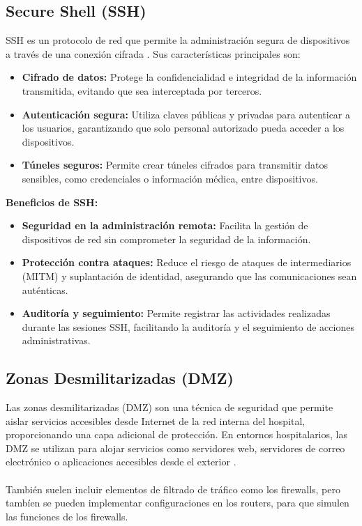 \subsection{Secure Shell (SSH)}
\label{subsec:ssh}
SSH es un protocolo de red que permite la administración segura de dispositivos a través de una conexión cifrada \cite{cisco-hospital-design}. Sus características principales son:
\begin{itemize}
    \item \textbf{Cifrado de datos:} Protege la confidencialidad e integridad de la información transmitida, evitando que sea interceptada por terceros.
    \item \textbf{Autenticación segura:} Utiliza claves públicas y privadas para autenticar a los usuarios, garantizando que solo personal autorizado pueda acceder a los dispositivos.
    \item \textbf{Túneles seguros:} Permite crear túneles cifrados para transmitir datos sensibles, como credenciales o información médica, entre dispositivos.
\end{itemize}
\textbf{Beneficios de SSH:}
\begin{itemize}
    \item \textbf{Seguridad en la administración remota:} Facilita la gestión de dispositivos de red sin comprometer la seguridad de la información.
    \item \textbf{Protección contra ataques:} Reduce el riesgo de ataques de intermediarios (\ac{MITM}) y suplantación de identidad, asegurando que las comunicaciones sean auténticas.
    \item \textbf{Auditoría y seguimiento:} Permite registrar las actividades realizadas durante las sesiones SSH, facilitando la auditoría y el seguimiento de acciones administrativas.
\end{itemize}

\subsection{Zonas Desmilitarizadas (DMZ)}
Las zonas desmilitarizadas (DMZ) son una técnica de seguridad que permite aislar servicios accesibles desde Internet de la red interna del hospital, proporcionando una capa adicional de protección.
En entornos hospitalarios, las DMZ se utilizan para alojar servicios como servidores web, servidores de correo electrónico o aplicaciones accesibles desde el exterior \cite{dmz}.
\\ \\
También suelen incluir elementos de filtrado de tráfico como los firewalls, pero tambíen se pueden implementar configuraciones en los routers, para que simulen las funciones de los firewalls.

